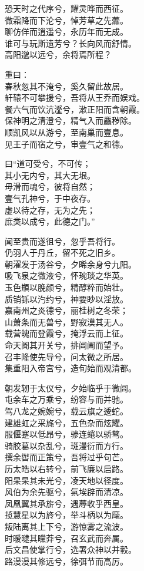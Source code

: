 \documentclass[]{article}
\begin{document}
恐天时之代序兮，耀灵晔而西征。\\
微霜降而下沦兮，悼芳草之先蘦。\\
聊仿佯而逍遥兮，永历年而无成。\\
谁可与玩斯遗芳兮？长向风而舒情。\\
高阳邈以远兮，余将焉所程？

重曰：\\
春秋忽其不淹兮，奚久留此故居。\\
轩辕不可攀援兮，吾将从王乔而娱戏。\\
餐六气而饮沆瀣兮，漱正阳而含朝霞。\\
保神明之清澄兮，精气入而麤秽除。\\
顺凯风以从游兮，至南巢而壹息。\\
见王子而宿之兮，审壹气之和德。

曰``道可受兮，不可传；\\
其小无内兮，其大无垠。\\
毋滑而魂兮，彼将自然；\\
壹气孔神兮，于中夜存。\\
虚以待之存，无为之先；\\
庶类以成兮，此德之门。''

闻至贵而遂徂兮，忽乎吾将行。\\
仍羽人于丹丘，留不死之旧乡。\\
朝濯发于汤谷兮，夕晞余身兮九阳。\\
吸飞泉之微液兮，怀琬琰之华英。\\
玉色頩以脕颜兮，精醇粹而始壮。\\
质销铄以汋约兮，神要眇以淫放。\\
嘉南州之炎德兮，丽桂树之冬荣；\\
山萧条而无兽兮，野寂漠其无人。\\
载营魄而登霞兮，掩浮云而上征。\\
命天阍其开关兮，排阊阖而望予。\\
召丰隆使先导兮，问太微之所居。\\
集重阳入帝宫兮，造旬始而观清都。

朝发轫于太仪兮，夕始临乎于微闾。\\
屯余车之万乘兮，纷容与而并驰。\\
驾八龙之婉婉兮，载云旗之逶蛇。\\
建雄虹之采旄兮，五色杂而炫耀。\\
服偃蹇以低昂兮，骖连蜷以骄骜。\\
骑胶葛以杂乱兮，斑漫衍而方行。\\
撰余辔而正策兮，吾将过乎句芒。\\
历太皓以右转兮，前飞廉以启路。\\
阳杲杲其未光兮，凌天地以径度。\\
风伯为余先驱兮，氛埃辟而清凉。\\
凤凰翼其承旂兮，遇蓐收乎西皇。\\
揽慧星以为旍兮，举斗柄以为麾。\\
叛陆离其上下兮，游惊雾之流波。\\
时暧曃其曭莽兮，召玄武而奔属。\\
后文昌使掌行兮，选署众神以并轂。\\
路漫漫其修远兮，徐弭节而高厉。
\end{document}
